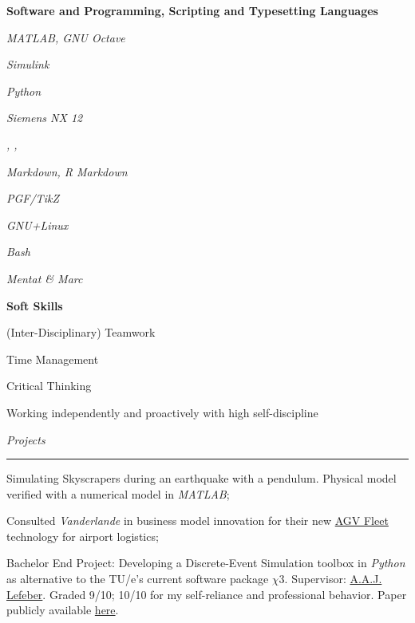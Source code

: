 \documentclass[12pt]{article}
\begin{document}
\textbf{Software and Programming, Scripting and Typesetting Languages}\\

\begin{multicols}{3}
\begin{compactitem}
    \item \textit{MATLAB, GNU Octave}
    \item \textit{Simulink}
    \item \textit{Python}
    \item \textit{Siemens NX 12}
    \item \textit{\LaTeXe, , }
    \item \textit{Markdown, R Markdown}
    \item \textit{PGF/TikZ}
    \item \textit{GNU+Linux}
    \item \textit{Bash}
    \item \textit{Mentat \& Marc}
\end{compactitem}
\end{multicols}


\textbf{Soft Skills}\\

\begin{multicols}{2}
\begin{compactitem}
    \item (Inter-Disciplinary) Teamwork
    \item Time Management
    \item Critical Thinking
    \item Working independently and proactively with high self-discipline
\end{compactitem}
\end{multicols}

\textit{\huge{Projects}} \\
\noindent\hfil\rule{\textwidth}{.4pt}\hfil

\begin{compactitem}
    \item Simulating Skyscrapers during an earthquake with a pendulum. Physical model verified with a numerical model in \textit{MATLAB};
    \item Consulted \textit{Vanderlande} in business model innovation for their new  \href{https://www.vanderlande.com/evolutions/fleet/}{AGV Fleet} technology for airport logistics;
    \item Bachelor End Project: Developing a Discrete-Event Simulation toolbox in \textit{Python} as alternative to the TU/e's current software package $\chi3$. Supervisor: \href{https://www.tue.nl/en/research/researchers/erjen-lefeber/}{A.A.J. Lefeber}. Graded 9/10; 10/10 for my self-reliance and professional behavior. Paper publicly available \href{https://dc.wtb.tue.nl/lefeber/do_download_pdf.php?id=288}{here}.
\end{compactitem}
\vspace{0.5cm}
\end{document}
